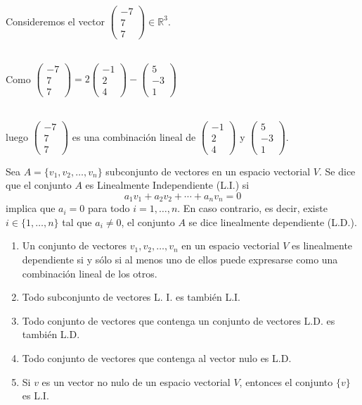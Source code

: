 \begin{ejem}
Consideremos el vector $\begin{pmatrix} -7 \\ 7 \\ 7  \end{pmatrix} \in \mathbb{R}^3$. 
\\\

Como $\begin{pmatrix} -7 \\ 7 \\ 7  \end{pmatrix} = 2\begin{pmatrix} -1 \\ 2 \\ 4 \end{pmatrix} - \begin{pmatrix} 5 \\ -3 \\ 1 \end{pmatrix}$ 
\\\

luego $\begin{pmatrix} -7 \\ 7 \\ 7  \end{pmatrix}$ es una combinaci\'on lineal de $\begin{pmatrix} -1 \\ 2 \\ 4 \end{pmatrix}$ y $\begin{pmatrix} 5 \\ -3 \\ 1 \end{pmatrix}$.
\end{ejem}


\begin{defin}
Sea $A=\{v_1, v_2, \dots, v_n\}$ subconjunto de vectores en un espacio vectorial $V$. Se dice que el conjunto $A$ es
Linealmente Independiente (L.I.) si 
$$ a_1 v_1 + a_2v_2 + \cdots +a_n v_n=0$$ 
implica que $a_i=0$ para todo $i=1, \dots, n.$
En caso contrario, es decir, existe $i\in \{1,\dots, n\}$ tal que $a_i\neq 0$, el conjunto $A$ se dice linealmente dependiente (L.D.).
\end{defin}

\begin{rmk}
\begin{enumerate}
\item 
Un conjunto de vectores $v_1,v_2, \dots , v_n$ en un espacio vectorial $V$ es linealmente dependiente si y sólo si al menos uno de ellos puede expresarse como una combinaci\'on lineal de los otros.

    \item Todo subconjunto de vectores L. I. es también L.I.
    \item Todo conjunto de vectores que contenga un conjunto de vectores L.D. es también
L.D.
\item Todo conjunto de vectores que contenga al vector nulo es L.D.
\item Si $v$ es un vector no nulo de un espacio vectorial $V$, entonces el conjunto $\{v\}$ es
L.I.
\end{enumerate}
\end{rmk}


